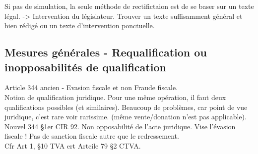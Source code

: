 \documentclass{book}
\begin{document}
Si pas de simulation, la seule méthode de rectifictaion est de se baser sur un texte légal. -> Intervention du législateur. Trouver un texte suffisamment général et bien rédigé ou un texte d'intervention ponctuelle.

\subsection{Mesures générales - Requalification ou inopposabilités de qualification}

Article 344 ancien - Evasion fiscale et non Fraude fiscale.\\

Notion de qualification juridique. Pour une même opération, il faut deux qualifications possibles (et similaires). Beaucoup de problèmes, car point de vue juridique, c'est rare voir rarissime. (même vente/donation n'est pas applicable).\\

Nouvel 344 §1er CIR 92. Non opposabilité de l'acte juridique. Vise l'évasion fiscale ! Pas de sanction fiscale autre que le redressement.\\

Cfr Art 1, §10 TVA ert Artcile 79 §2 CTVA.\\







   
\nocite{*}

\end{document}
